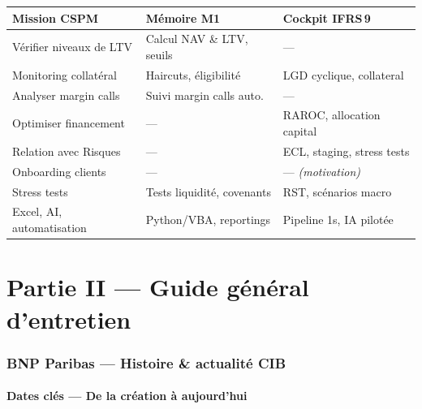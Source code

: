 \documentclass[11pt,a4paper]{article}
\begin{document}
\begin{center}
\small
\begin{tabular}{@{}p{5.2cm}p{4.0cm}p{4.0cm}@{}}
\toprule
\textbf{Mission CSPM} & \textbf{M\'emoire M1} & \textbf{Cockpit IFRS\,9} \\
\midrule
V\'erifier niveaux de LTV & Calcul NAV \& LTV, seuils & --- \\[3pt]
Monitoring collat\'eral & Haircuts, \'eligibilit\'e & LGD cyclique, collateral \\[3pt]
Analyser margin calls & Suivi margin calls auto. & --- \\[3pt]
Optimiser financement & --- & RAROC, allocation capital \\[3pt]
Relation avec Risques & --- & ECL, staging, stress tests \\[3pt]
Onboarding clients & --- & --- \textit{(motivation)} \\[3pt]
Stress tests & Tests liquidit\'e, covenants & RST, sc\'enarios macro \\[3pt]
Excel, AI, automatisation & Python/VBA, reportings & Pipeline 1s, IA pilot\'ee \\
\bottomrule
\end{tabular}
\end{center}


%
%

\newpage
\part*{Partie II --- Guide g\'en\'eral d'entretien}

\section{BNP Paribas --- Histoire \& actualit\'e CIB}

\subsection{Dates cl\'es --- De la cr\'eation \`a aujourd'hui}
\end{document}

